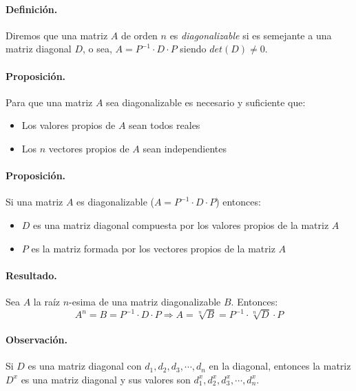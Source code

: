 \paragraph{Definici\'on.} 
Diremos que una matriz $A$ de orden $n$ es \emph{diagonalizable}
 si es semejante a una matriz diagonal $D$, o sea,
$A = P^{-1} \cdot D \cdot P$ siendo $det(D) \neq 0$.

\paragraph{Proposici\'on.} 
Para que una matriz $A$ sea diagonalizable es necesario y suficiente que:
\begin{itemize}
\item Los valores propios de $A$ sean todos reales
\item Los $n$ vectores propios de $A$ sean independientes
\end{itemize}

\paragraph{Proposici\'on.}
Si una matriz $A$ es diagonalizable ($A = P^{-1} \cdot D \cdot P$) entonces: 
\begin{itemize}
\item $D$ es una matriz diagonal compuesta por los valores propios de la matriz $A$
\item $P$ es la matriz formada por los vectores propios de la matriz $A$
\end{itemize}

\paragraph{Resultado.}
Sea $A$ la ra\'iz $n$-esima de una matriz diagonalizable $B$. Entonces:
\begin{displaymath}
A^n = B = P^{-1} \cdot D \cdot P 
\Longrightarrow  
A = \sqrt[n]{B} = P^{-1} \cdot \sqrt[n]{D} \cdot P
\end{displaymath} 

\paragraph{Observaci\'on.}
Si $D$ es una matriz diagonal con $d_1, d_2, d_3, \cdots, d_n$ en la diagonal,
entonces la matriz $D^x$ es una matriz diagonal y sus valores son
$d_1^x, d_2^x, d_3^x, \cdots, d_n^x$.

